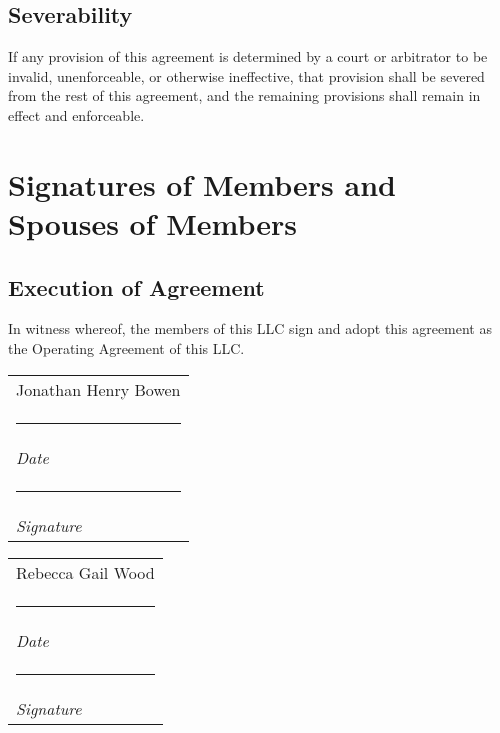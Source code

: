 \documentclass{article}
\makeatletter
\newcommand{\namesigdate}[2][5cm]{%
  \begin{tabular}{@{}p{#1}@{}}
    #2 \\[2\normalbaselineskip] \hrule \\[0pt]
    {\small \textit{Date}} \\[2\normalbaselineskip] \hrule \\[0pt]
    {\small \textit{Signature}}
  \end{tabular}
}
\makeatother
\begin{document}
			\subsection{Severability}
			If any provision of this agreement is determined by a court or arbitrator to be invalid, unenforceable, or otherwise ineffective, that provision shall be severed from the rest of this agreement, and the remaining provisions shall remain in effect and enforceable.

		\vspace{1.5in}

		\section{Signatures of Members and Spouses of Members}

			\subsection{Execution of Agreement}
			In witness whereof, the members of this LLC sign and adopt this agreement as the Operating Agreement of this LLC.\\
			\vspace*{.25 cm}

			\noindent \namesigdate{Jonathan Henry Bowen} \hfill \namesigdate{Rebecca Gail Wood}

			\vspace*{.25 cm}

%
\end{document}
